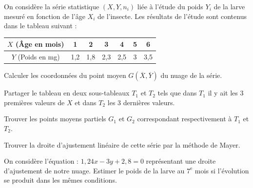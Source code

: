 \documentclass[11pt]{article}
\begin{document}
On considère la série statistique $(X, Y, n_i)$ liée à l'étude du poids $Y_i$ de la larve mesuré en fonction de l'âge $X_i$ de l'insecte. Les résultats de l'étude sont contenus dans le tableau suivant :
\begin{center}\renewcommand{\arraystretch}{1.4}
\begin{tabular}{|c|c|c|c|c|c|c|}
\hline
$X$ (Âge en mois) & 1 & 2 & 3 & 4 & 5 & 6 \\
\hline
$Y$ (Poids en mg) & 1{,}2 & 1{,}8 & 2{,}3 & 2{,}5 & 3 & 3{,}5 \\
\hline
\end{tabular}
\end{center}
\begin{questions}
  \item Calculer les coordonnées du point moyen $G(\overline{X}, \overline{Y})$ du nuage de la série.
  \item \begin{sousq}
    \item Partager le tableau en deux sous-tableaux $T_1$ et $T_2$ tels que dans $T_1$ il y ait les 3 premières valeurs de $X$ et dans $T_2$ les 3 dernières valeurs.
    \item Trouver les points moyens partiels $G_1$ et $G_2$ correspondant respectivement à $T_1$ et $T_2$.
    \item Trouver la droite d'ajustement linéaire de cette série par la méthode de Mayer.
  \end{sousq}
  \item On considère l'équation : $1{,}24x - 3y + 2{,}8 = 0$ représentant une droite d'ajustement de notre nuage. Estimer le poids de la larve au $7^{\text{e}}$ mois si l'évolution se produit dans les mêmes conditions.
\end{questions}
\end{document}

